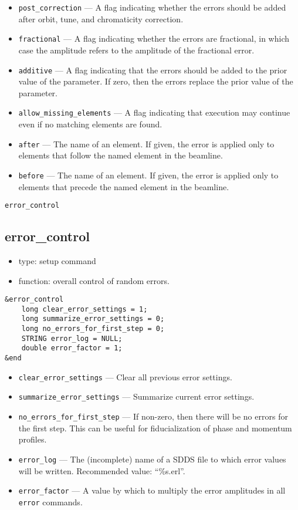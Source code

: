 \documentclass[11pt]{article}
\begin{document}
\begin{itemize}
\item \verb|post_correction| --- A flag indicating whether the errors should be added after orbit, tune, and chromaticity correction.
\item \verb|fractional| --- A flag indicating whether the errors are fractional, in which case the amplitude refers to
the amplitude of the fractional error.
\item \verb|additive| --- A flag indicating that the errors should be added to the prior value of the
parameter.  If zero, then the errors replace the prior value of the parameter.
\item \verb|allow_missing_elements| --- A flag indicating that execution may continue even if no matching elements are found.
\item \verb|after| --- The name of an element.  If given, the error is applied only to elements
 that follow the named element in the beamline.
\item \verb|before| --- The name of an element.  If given, the error is applied only to elements
 that precede the named element in the beamline.
\end{itemize}

\begin{latexonly}
\newpage
\begin{center}{\Large\verb|error_control|}\end{center}
\end{latexonly}
\subsection{error\_control \label{subsec:errorcontrol}}

\begin{itemize}
\item type: setup command
\item function: overall control of random errors.
\end{itemize}

\begin{verbatim}
&error_control
    long clear_error_settings = 1;
    long summarize_error_settings = 0;
    long no_errors_for_first_step = 0;
    STRING error_log = NULL;
    double error_factor = 1;
&end
\end{verbatim}

\begin{itemize}
\item \verb|clear_error_settings| --- Clear all previous error settings.
\item \verb|summarize_error_settings| --- Summarize current error settings.
\item \verb|no_errors_for_first_step| --- If non-zero, then there will be no errors for the first step.  This can be useful for
 fiducialization of phase and momentum profiles.
\item \verb|error_log| --- The (incomplete) name of a SDDS file to which error values will be written.  Recommended value: ``\%s.erl''.
\item \verb|error_factor| --- A value by which to multiply the error amplitudes in all \verb|error| commands.
\end{itemize}
\end{document}
